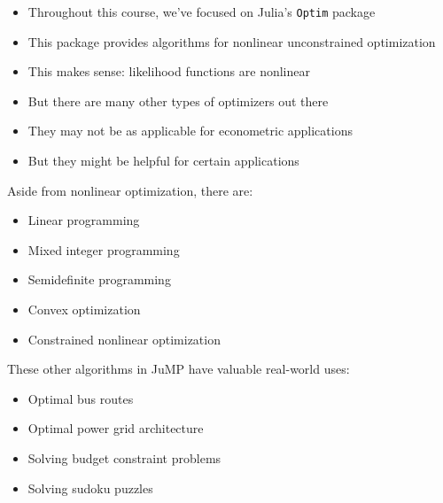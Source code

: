 \documentclass[aspectratio=169]{beamer}
\begin{document}
\begin{frame}

\begin{itemize}
\itemsep1.5em
\item<1-> Throughout this course, we've focused on Julia's \texttt{Optim} package
\item<2-> This package provides algorithms for nonlinear unconstrained optimization
\item<3-> This makes sense: likelihood functions are nonlinear
\item<4-> But there are many other types of optimizers out there
\item<5-> They may not be as applicable for econometric applications
\item<6-> But they might be helpful for certain applications
\end{itemize}

\end{frame}

\begin{frame}

Aside from nonlinear optimization, there are:

\bigskip{}

\begin{itemize}
\itemsep1.5em
\item<2-> Linear programming
\item<3-> Mixed integer programming
\item<4-> Semidefinite programming
\item<5-> Convex optimization
\item<6-> Constrained nonlinear optimization
\end{itemize}

\bigskip{}


\end{frame}

\begin{frame}

These other algorithms in JuMP have valuable real-world uses:

\bigskip{}

\begin{itemize}
\itemsep1.5em
\item<2-> Optimal bus routes
\item<3-> Optimal power grid architecture
\item<4-> Solving budget constraint problems
\item<5-> Solving sudoku puzzles
\end{itemize}

\bigskip{}


\bigskip{}


\end{frame}
\end{document}
